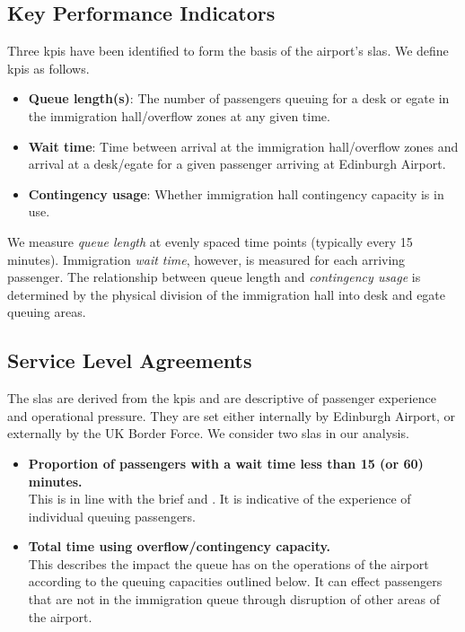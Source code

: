 \documentclass[10pt]{article}
\begin{document}
\subsection{Key Performance Indicators}

Three \glspl{kpi} have been identified to form the basis of the airport's \glspl{sla}. We define \glspl{kpi} as follows.

\begin{itemize}
    \item \textbf{Queue length(s)}: The number of passengers queuing for a desk or \gls{egate} in the immigration hall/overflow zones at any given time.
    \item \textbf{Wait time}: Time between arrival at the immigration hall/overflow zones and arrival at a desk/\gls{egate} for a given passenger arriving at Edinburgh Airport. 
    \item \textbf{Contingency usage}: Whether immigration hall contingency capacity is in use.
\end{itemize}

We measure \textit{queue length} at evenly spaced time points (typically every 15 minutes). Immigration \textit{wait time}, however, is measured for each arriving passenger. The relationship between queue length and \textit{contingency usage} is determined by the physical division of the immigration hall into desk and \gls{egate} queuing areas.

\subsection{Service Level Agreements}
The \glspl{sla} are derived from the \glspl{kpi} and are descriptive of passenger experience and operational pressure. They are set either internally by Edinburgh Airport, or externally by the UK Border Force. We consider two \glspl{sla} in our analysis.
\begin{itemize}
    \item \textbf{Proportion of passengers with a wait time less than 15 (or 60) minutes.} \\
    This is in line with the brief and \cite{UK_border_2025}. It is indicative of the experience of individual queuing passengers.
    \item \textbf{Total time using overflow/contingency capacity.} \\
    This describes the impact the queue has on the operations of the airport according to the queuing capacities outlined below. It can effect passengers that are not in the immigration queue through disruption of other areas of the airport.
\end{itemize}
\end{document}
